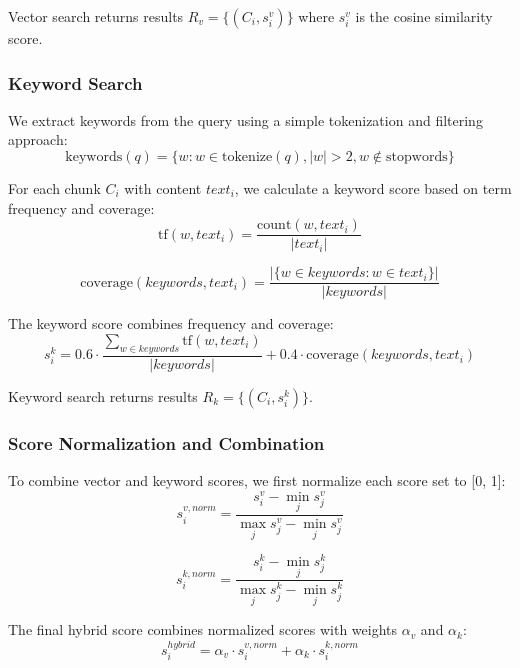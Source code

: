 \documentclass[runningheads]{llncs}
\begin{document}
Vector search returns results $R_v = \{(C_i, s_i^v)\}$ where $s_i^v$ is the cosine similarity score.

\subsubsection{Keyword Search}

We extract keywords from the query using a simple tokenization and filtering approach:
\begin{equation}
\mathrm{keywords}(q) = \{w : w \in \mathrm{tokenize}(q), |w| > 2, w \notin \mathrm{stopwords}\}
\end{equation}

For each chunk $C_i$ with content $text_i$, we calculate a keyword score based on term frequency and coverage:
\begin{equation}
\mathrm{tf}(w, text_i) = \frac{\mathrm{count}(w, text_i)}{|text_i|}
\end{equation}

\begin{equation}
\mathrm{coverage}(keywords, text_i) = \frac{|\{w \in keywords : w \in text_i\}|}{|keywords|}
\end{equation}

The keyword score combines frequency and coverage:
\begin{equation}
s_i^k = 0.6 \cdot \frac{\sum_{w \in keywords} \mathrm{tf}(w, text_i)}{|keywords|} + 0.4 \cdot \mathrm{coverage}(keywords, text_i)
\end{equation}

Keyword search returns results $R_k = \{(C_i, s_i^k)\}$.

\subsubsection{Score Normalization and Combination}

To combine vector and keyword scores, we first normalize each score set to [0, 1]:
\begin{equation}
s_i^{v,norm} = \frac{s_i^v - \min_{j} s_j^v}{\max_{j} s_j^v - \min_{j} s_j^v}
\end{equation}

\begin{equation}
s_i^{k,norm} = \frac{s_i^k - \min_{j} s_j^k}{\max_{j} s_j^k - \min_{j} s_j^k}
\end{equation}

The final hybrid score combines normalized scores with weights $\alpha_v$ and $\alpha_k$:
\begin{equation}
s_i^{hybrid} = \alpha_v \cdot s_i^{v,norm} + \alpha_k \cdot s_i^{k,norm}
\end{equation}
\end{document}
